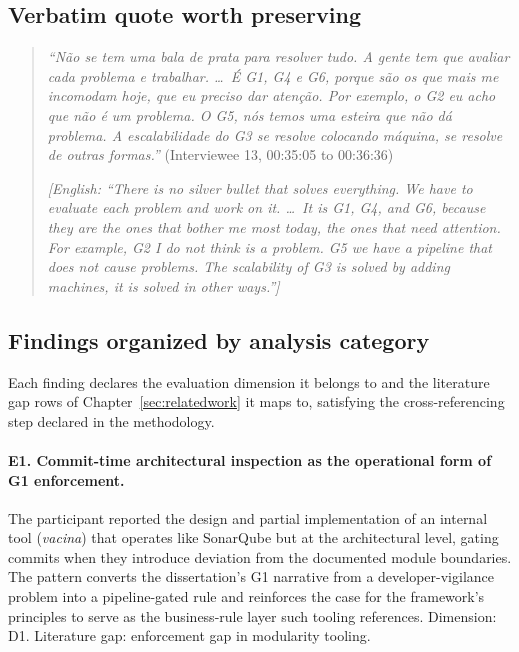 \subsection*{Verbatim quote worth preserving}

\begin{quote}
\emph{``N\~ao se tem uma bala de prata para resolver tudo. A gente tem que avaliar cada problema e trabalhar. \ldots\ \'E G1, G4 e G6, porque s\~ao os que mais me incomodam hoje, que eu preciso dar aten\c{c}\~ao. Por exemplo, o G2 eu acho que n\~ao \'e um problema. O G5, n\'os temos uma esteira que n\~ao d\'a problema. A escalabilidade do G3 se resolve colocando m\'aquina, se resolve de outras formas.''} (Interviewee 13, 00:35:05 to 00:36:36)

\emph{[English: ``There is no silver bullet that solves everything. We have to evaluate each problem and work on it. \ldots\ It is G1, G4, and G6, because they are the ones that bother me most today, the ones that need attention. For example, G2 I do not think is a problem. G5 we have a pipeline that does not cause problems. The scalability of G3 is solved by adding machines, it is solved in other ways.'']}
\end{quote}

\subsection*{Findings organized by analysis category}

Each finding declares the evaluation dimension it belongs to and the literature gap rows of Chapter~\ref{sec:relatedwork} it maps to, satisfying the cross-referencing step declared in the methodology.

\paragraph*{E1. Commit-time architectural inspection as the operational form of G1 enforcement.} The participant reported the design and partial implementation of an internal tool (\emph{vacina}) that operates like SonarQube but at the architectural level, gating commits when they introduce deviation from the documented module boundaries. The pattern converts the dissertation's G1 narrative from a developer-vigilance problem into a pipeline-gated rule and reinforces the case for the framework's principles to serve as the business-rule layer such tooling references. Dimension: D1. Literature gap: enforcement gap in modularity tooling.

